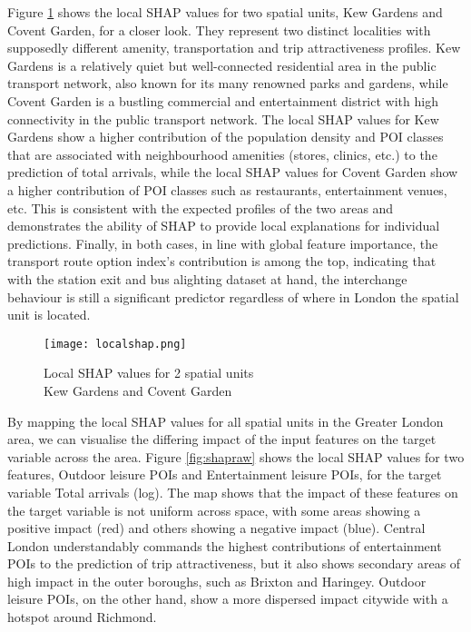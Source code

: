 Figure \ref{fig:localshap} shows the local SHAP values for two spatial units, Kew Gardens and Covent Garden, for a closer look. They represent two distinct localities with supposedly different amenity, transportation and trip attractiveness profiles. Kew Gardens is a relatively quiet but well-connected residential area in the public transport network, also known for its many renowned parks and gardens, while Covent Garden is a bustling commercial and entertainment district with high connectivity in the public transport network. The local SHAP values for Kew Gardens show a higher contribution of the population density and POI classes that are associated with neighbourhood amenities (stores, clinics, etc.) to the prediction of total arrivals, while the local SHAP values for Covent Garden show a higher contribution of POI classes such as restaurants, entertainment venues, etc. This is consistent with the expected profiles of the two areas and demonstrates the ability of SHAP to provide local explanations for individual predictions. Finally, in both cases, in line with global feature importance, the transport route option index's contribution is among the top, indicating that with the station exit and bus alighting dataset at hand, the interchange behaviour is still a significant predictor regardless of where in London the spatial unit is located.

\begin{figure}[!ht]
    \centering
    \texttt{[image: localshap.png]}
    \captionsetup{justification=centering}
    \caption{Local SHAP values for 2 spatial units\\Kew Gardens and Covent Garden}
    \label{fig:localshap}
\end{figure}

By mapping the local SHAP values for all spatial units in the Greater London area, we can visualise the differing impact of the input features on the target variable across the area. Figure \ref{fig:shapraw} shows the local SHAP values for two features, Outdoor leisure POIs and Entertainment leisure POIs, for the target variable Total arrivals (log). The map shows that the impact of these features on the target variable is not uniform across space, with some areas showing a positive impact (red) and others showing a negative impact (blue). Central London understandably commands the highest contributions of entertainment POIs to the prediction of trip attractiveness, but it also shows secondary areas of high impact in the outer boroughs, such as Brixton and Haringey. Outdoor leisure POIs, on the other hand, show a more dispersed impact citywide with a hotspot around Richmond. 

